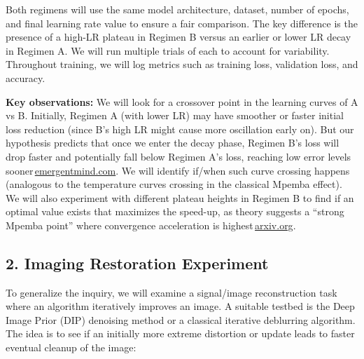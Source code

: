 \documentclass[11pt]{article}
\begin{document}
Both regimens will use the same model architecture, dataset, number of epochs, and final learning rate value to ensure a fair comparison. The key difference is the presence of a high-LR plateau in Regimen B versus an earlier or lower LR decay in Regimen A. We will run multiple trials of each to account for variability. Throughout training, we will log metrics such as training loss, validation loss, and accuracy.

\textbf{Key observations:} We will look for a crossover point in the learning curves of A vs B. Initially, Regimen A (with lower LR) may have smoother or faster initial loss reduction (since B's high LR might cause more oscillation early on). But our hypothesis predicts that once we enter the decay phase, Regimen B's loss will drop faster and potentially fall below Regimen A's loss, reaching low error levels sooner\,\href{https://www.emergentmind.com/topics/warmup-stable-decay-wsd-schedules#:~:text=Notably%2C the greatest loss reduction,May 2025 %2C  25}{emergentmind.com}. We will identify if/when such curve crossing happens (analogous to the temperature curves crossing in the classical Mpemba effect). We will also experiment with different plateau heights in Regimen B to find if an optimal value exists that maximizes the speed-up, as theory suggests a ``strong Mpemba point'' where convergence acceleration is highest\,\href{https://arxiv.org/html/2507.04206v1#:~:text=explanation for the necessity of,LLMs with minimal hyperparameter sweep}{arxiv.org}.

\subsection*{2. Imaging Restoration Experiment}
To generalize the inquiry, we will examine a signal/image reconstruction task where an algorithm iteratively improves an image. A suitable testbed is the Deep Image Prior (DIP) denoising method or a classical iterative deblurring algorithm. The idea is to see if an initially more extreme distortion or update leads to faster eventual cleanup of the image:
\end{document}
